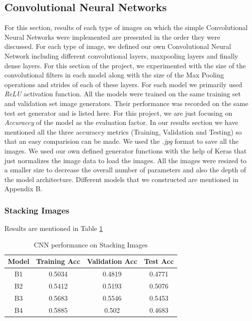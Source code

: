\documentclass[letterpaper, 12 pt, conference]{ieeeconf}  %
\begin{document}
\subsection{\textbf{Convolutional Neural Networks}}
For this section, results of each type of images on which the simple Convolutional Neural Networks were implemented are presented in the order they were discussed. For each type of image, we defined our own Convolutional Neural Network including different convolutional layers, maxpooling layers and finally dense layers. For this section of the project, we experimented with the size of the convolutional filters in each model along with the size of the Max Pooling operations and strides of each of these layers. For each model we primarily used \textit{ReLU} activation function. All the models were trained on the same training set and validation set image generators. Their performance was recorded on the same test set generator and is listed here. For this project, we are just focusing on \textit{Accuraccy} of the model as the evaluation factor. In our results section we have mentioned all the three accuraccy metrics (Training, Validation and Testing) so that an easy comparision can be made. We used the \textit{.jpg} format to save all the images. We used our own defined generator functions with the help of Keras that just normalizes the image data to load the images. All the images were resized to a smaller size to decrease the overall number of parameters and also the depth of the model architecture. Different models that we constructed are mentioned in Appendix B.

\subsubsection{Stacking Images}
Results are mentioned in Table \ref{tab:Stacking_Acc}
\begin{table}[!h]
\centering
\caption{CNN performance on Stacking Images}
\begin{tabular}{| c || c || c || c |} %
\hline %
Model & Training Acc & Validation Acc & Test Acc\\
   \hline \hline
B1 & 0.5034 & 0.4819 & 0.4771 \\
\hline
B2 & 0.5412 & 0.5193 & 0.5076 \\
\hline
B3 & 0.5683 & 0.5546 & 0.5453 \\	
\hline
B4 & 0.5885 & 0.502 & 0.4683  \\
\hline
   \end{tabular}
\label{tab:Stacking_Acc} 
\end{table}
\end{document}
